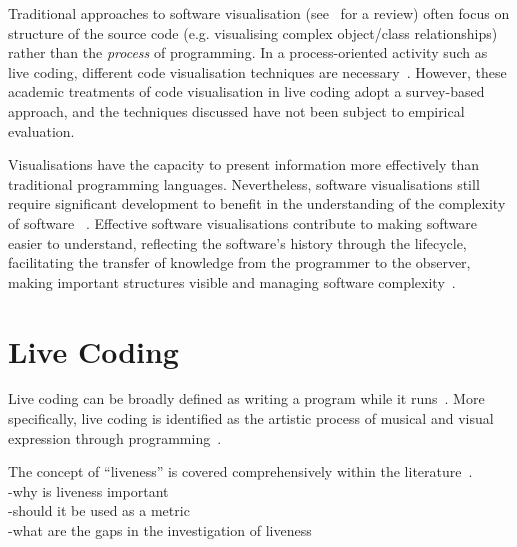 
Traditional approaches to software visualisation (see~\cite{Novais2013} for a review) often focus on structure of the source code (e.g. visualising complex object/class relationships) rather than the \emph{process} of programming. In a process-oriented activity such as live coding, different code visualisation techniques are necessary~\cite{McLean2010a,Magnusson2013}. However, these academic treatments of code visualisation in live coding adopt a survey-based approach, and the techniques discussed have not been subject to empirical evaluation.

Visualisations have the capacity to present information more effectively than traditional programming languages. Nevertheless, software visualisations still require significant development to benefit in the understanding of the complexity of software ~\cite{Baecker1995}. Effective software visualisations contribute to making software easier to understand, reflecting the software's history through the lifecycle, facilitating the transfer of knowledge from the programmer to the observer, making important structures visible and managing software complexity~\cite{Baecker1995}.

\section{Live Coding}

Live coding can be broadly defined as writing a program while it runs~\cite{Ward2004}. More specifically, live coding is identified as the artistic process of musical and visual expression through programming~\cite{Collins2003}.


The concept of ``liveness'' is covered comprehensively within the literature~\cite{Auslander,Masura2007}.\\
-why is liveness important\\
-should it be used as a metric\\
-what are the gaps in the investigation of liveness

